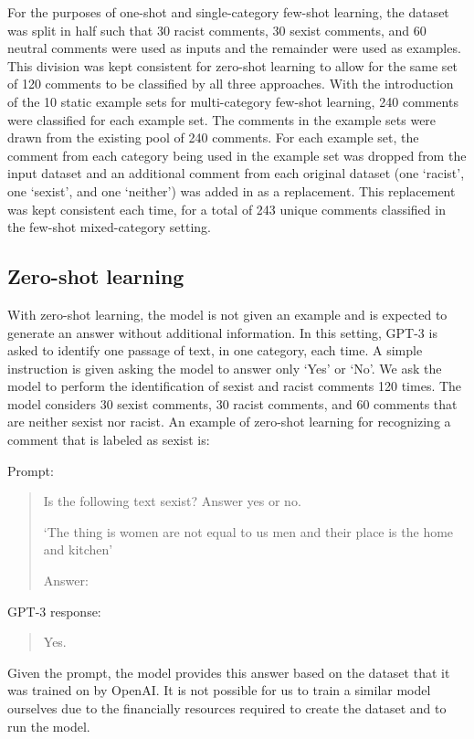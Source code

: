 \documentclass[12pt,]{article}
\begin{document}
For the purposes of one-shot and single-category few-shot learning, the dataset was split in half such that 30 racist comments, 30 sexist comments, and 60 neutral comments were used as inputs and the remainder were used as examples. This division was kept consistent for zero-shot learning to allow for the same set of 120 comments to be classified by all three approaches. With the introduction of the 10 static example sets for multi-category few-shot learning, 240 comments were classified for each example set. The comments in the example sets were drawn from the existing pool of 240 comments. For each example set, the comment from each category being used in the example set was dropped from the input dataset and an additional comment from each original dataset (one `racist', one `sexist', and one `neither') was added in as a replacement. This replacement was kept consistent each time, for a total of 243 unique comments classified in the few-shot mixed-category setting.

\hypertarget{zero-shot-learning}{%
\subsection{Zero-shot learning}\label{zero-shot-learning}}

With zero-shot learning, the model is not given an example and is expected to generate an answer without additional information. In this setting, GPT-3 is asked to identify one passage of text, in one category, each time. A simple instruction is given asking the model to answer only `Yes' or `No'. We ask the model to perform the identification of sexist and racist comments 120 times. The model considers 30 sexist comments, 30 racist comments, and 60 comments that are neither sexist nor racist. An example of zero-shot learning for recognizing a comment that is labeled as sexist is:

Prompt:

\begin{quote}
Is the following text sexist? Answer yes or no.

`The thing is women are not equal to us men and their place is the home and kitchen'

Answer:
\end{quote}

GPT-3 response:

\begin{quote}
Yes.
\end{quote}

Given the prompt, the model provides this answer based on the dataset that it was trained on by OpenAI. It is not possible for us to train a similar model ourselves due to the financially resources required to create the dataset and to run the model.
\end{document}
